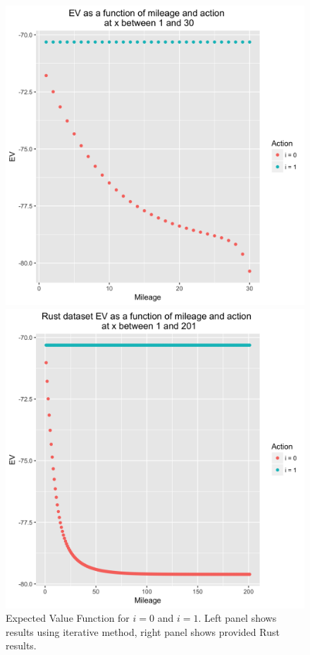 \documentclass[paper=a4, fontsize=11pt]{scrartcl} %
\numberwithin{equation}{section} %
\numberwithin{figure}{section} %
\numberwithin{table}{section} %
\begin{document}
\begin{itemize}
\begin{itemize}
\begin{figure}[ht!]
\centering
	\begin{minipage}[b]{.46\linewidth}
		\includegraphics[scale=.1]{ev_plot.png}
	\end{minipage}
	\begin{minipage}[b]{.46\linewidth}
		\includegraphics[scale=.1]{ev_plot_rust.png}
	\end{minipage}
\caption{Expected Value Function for $i = 0$ and $i = 1$. Left panel shows results using iterative method, right panel shows provided Rust results.}
\label{fig:ev_plot}
\end{figure}


\end{itemize}
\end{itemize}
\end{document}
